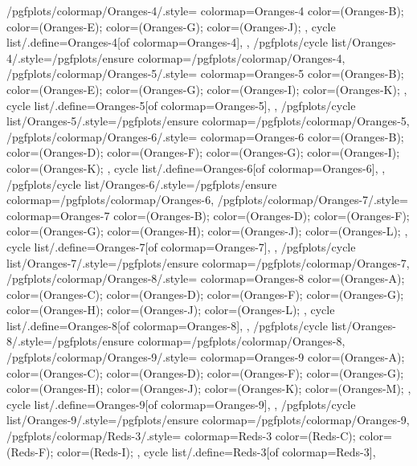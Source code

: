 {  %
  /pgfplots/colormap/Oranges-4/.style={
    colormap={Oranges-4}{
      color=(Oranges-B);
      color=(Oranges-E);
      color=(Oranges-G);
      color=(Oranges-J);
    },
    cycle list/.define={Oranges-4}{[of colormap=Oranges-4]},
  },
  /pgfplots/cycle list/Oranges-4/.style={/pgfplots/ensure colormap={/pgfplots/colormap/Oranges-4}},
  /pgfplots/colormap/Oranges-5/.style={
    colormap={Oranges-5}{
      color=(Oranges-B);
      color=(Oranges-E);
      color=(Oranges-G);
      color=(Oranges-I);
      color=(Oranges-K);
    },
    cycle list/.define={Oranges-5}{[of colormap=Oranges-5]},
  },
  /pgfplots/cycle list/Oranges-5/.style={/pgfplots/ensure colormap={/pgfplots/colormap/Oranges-5}},
  /pgfplots/colormap/Oranges-6/.style={
    colormap={Oranges-6}{
      color=(Oranges-B);
      color=(Oranges-D);
      color=(Oranges-F);
      color=(Oranges-G);
      color=(Oranges-I);
      color=(Oranges-K);
    },
    cycle list/.define={Oranges-6}{[of colormap=Oranges-6]},
  },
  /pgfplots/cycle list/Oranges-6/.style={/pgfplots/ensure colormap={/pgfplots/colormap/Oranges-6}},
  /pgfplots/colormap/Oranges-7/.style={
    colormap={Oranges-7}{
      color=(Oranges-B);
      color=(Oranges-D);
      color=(Oranges-F);
      color=(Oranges-G);
      color=(Oranges-H);
      color=(Oranges-J);
      color=(Oranges-L);
    },
    cycle list/.define={Oranges-7}{[of colormap=Oranges-7]},
  },
  /pgfplots/cycle list/Oranges-7/.style={/pgfplots/ensure colormap={/pgfplots/colormap/Oranges-7}},
  /pgfplots/colormap/Oranges-8/.style={
    colormap={Oranges-8}{
      color=(Oranges-A);
      color=(Oranges-C);
      color=(Oranges-D);
      color=(Oranges-F);
      color=(Oranges-G);
      color=(Oranges-H);
      color=(Oranges-J);
      color=(Oranges-L);
    },
    cycle list/.define={Oranges-8}{[of colormap=Oranges-8]},
  },
  /pgfplots/cycle list/Oranges-8/.style={/pgfplots/ensure colormap={/pgfplots/colormap/Oranges-8}},
  /pgfplots/colormap/Oranges-9/.style={
    colormap={Oranges-9}{
      color=(Oranges-A);
      color=(Oranges-C);
      color=(Oranges-D);
      color=(Oranges-F);
      color=(Oranges-G);
      color=(Oranges-H);
      color=(Oranges-J);
      color=(Oranges-K);
      color=(Oranges-M);
    },
    cycle list/.define={Oranges-9}{[of colormap=Oranges-9]},
  },
  /pgfplots/cycle list/Oranges-9/.style={/pgfplots/ensure colormap={/pgfplots/colormap/Oranges-9}},
  /pgfplots/colormap/Reds-3/.style={
    colormap={Reds-3}{
      color=(Reds-C);
      color=(Reds-F);
      color=(Reds-I);
    },
    cycle list/.define={Reds-3}{[of colormap=Reds-3]},
}}

